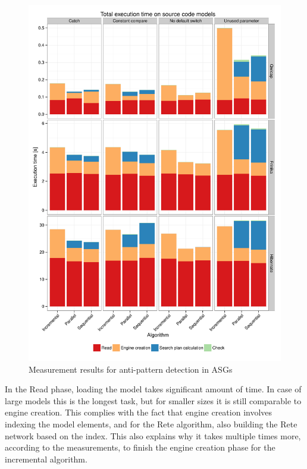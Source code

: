 \begin{figure}
	\centering
	\includegraphics[width=\textwidth]{pdfs/code_model.pdf}
	
	\caption{Measurement results for anti-pattern detection in ASGs}
	\label{fig:csmr-measurements}
\end{figure}


In the Read phase, loading the model takes significant amount of time. In case of large models this is the longest task, but for smaller sizes it is still comparable to engine creation. This complies with the fact that engine creation involves indexing the model elements, and for the Rete algorithm, also building the Rete network based on the index. This also explains why it takes multiple times more, according to the measurements, to finish the engine creation phase for the incremental algorithm.

